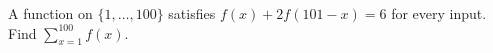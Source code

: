 A function on $\{1,\ldots,100\}$ satisfies $f(x)+2f(101-x)=6$ for every input. Find $\sum_{x=1}^{100}f(x)$.
